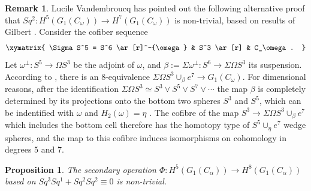 \documentclass{amsart}
\theoremstyle{plain}
\newtheorem{prop}[thm]  {Proposition}
\theoremstyle{definition}
\newtheorem{rem}[thm]{Remark}
\begin{document}
 \begin{rem}
 Lucile Vandembroucq has pointed out the following alternative proof that $Sq^2:H^5(G_1(C_{\omega}))\to H^7(G_1(C_{\omega}))$ is non-trivial, based on results of Gilbert \cite{Gilbert}. Consider the cofiber sequence
 \[
 \xymatrix{
 \Sigma S^5 = S^6 \ar[r]^-{\omega} & S^3 \ar[r] & C_\omega.
 }
 \]
 Let $\omega^\perp: S^5\to \Omega S^3$ be the adjoint of $\omega$, and $\beta:=\Sigma\omega^\perp: S^6\to \Sigma\Omega S^3$ its suspension. According to \cite[Proposition 4.3]{Gilbert}, there is an $8$-equivalence $\Sigma\Omega S^3 \cup_\beta e^7 \to G_1(C_\omega)$. For dimensional reasons, after the identification $\Sigma \Omega S^3\simeq S^3 \vee S^5 \vee S^7\vee\cdots$ the map $\beta$ is completely determined by its projections onto the bottom two spheres $S^3$ and $S^5$, which can be indentified with $\omega$ and $H_2(\omega)=\eta$ \cite{CLOT, Gilbert}. The cofibre of the map $S^3\to \Sigma\Omega S^3 \cup_\beta e^7$ which includes the bottom cell therefore has the homotopy type of $S^5\cup_\eta e^7$ wedge spheres, and the map to this cofibre induces isomorphisms on cohomology in degrees $5$ and $7$.
 \end{rem}
 
 \begin{prop}
 The secondary operation $\Phi:H^5(G_1(C_\alpha))\to H^8(G_1(C_\alpha))$ based on $Sq^3Sq^1 + Sq^2 Sq^2\equiv 0$ is non-trivial.
 \end{prop}
 
\end{document}
